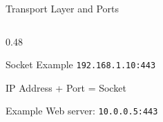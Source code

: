 \documentclass[aspectratio=169, 11pt]{beamer}
\begin{document}
\begin{frame}{Transport Layer and Ports}
\begin{columns}[T]
\begin{column}{0.48\textwidth}
            \vspace{0.3em}
            \begin{block}{Socket Example}
                \centering
                \texttt{\colorbox{rctcblue!15}{192.168.1.10}:\colorbox{tcpblue!20}{443}}
                
                \vspace{0.2em}
                \small
                \textcolor{rctcblue}{IP Address} + \textcolor{tcpblue}{Port} = Socket
            \end{block}
            
            \vspace{0.2em}
            \begin{exampleblock}{Example}
                \small
                Web server: \texttt{10.0.0.5:443}
            \end{exampleblock}
        \end{column}
    \end{columns}
\end{frame}
\end{document}
